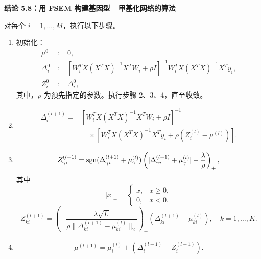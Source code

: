 \par\medskip{}
\noindent\textbf{结论 5.8：用 FSEM 构建基因型—甲基化网络的算法}\par
对每个 $i=1,\ldots,M$，执行以下步骤。
\begin{enumerate}[label=步骤 \arabic*：,leftmargin=4.8em]
\item 初始化：
\[
\begin{aligned}
\mu^0&:=0,\\
\Delta_i^0&:=[W_i^TX(X^TX)^{-1}X^TW_i+\rho I]^{-1}W_i^TX(X^TX)^{-1}X^Ty_i,\\
Z_i^0&:=\Delta_i^0,
\end{aligned}
\]
其中，$\rho$ 为预先指定的参数。执行步骤 2、3、4，直至收敛。
\item
\[
\begin{aligned}
\Delta_i^{(l+1)}
={}&[W_i^TX(X^TX)^{-1}X^TW_i+\rho I]^{-1}\\
&\quad\times[W_i^TX(X^TX)^{-1}X^Ty_i+\rho(Z_i^{(l)}-\mu^{(l)})].
\end{aligned}
\]
\item
\[
Z_{\gamma i}^{(l+1)}
=\operatorname{sgn}(\Delta_{\gamma i}^{(l+1)}+\mu_\gamma^{(l)})
\left(|\Delta_{\gamma i}^{(l+1)}+\mu_\gamma^{(l)}|-\frac\lambda\rho\right)_+,
\]
其中
\[
|x|_+=\begin{cases}x,&x\geq0,\\0,&x<0.\end{cases}
\]
\[
Z_{ki}^{(l+1)}
=\left(-\frac{\lambda\sqrt L}{\rho\lVert\Delta_{ki}^{(l+1)}-\mu_{ki}^{(l)}\rVert_2}\right)_+
(\Delta_{ki}^{(l+1)}-\mu_{ki}^{(l)}),\quad k=1,\ldots,K.
\]
\item
\[
\mu^{(l+1)}=\mu_i^{(l)}+(\Delta_i^{(l+1)}-Z_i^{(l+1)}).
\]
\end{enumerate}
